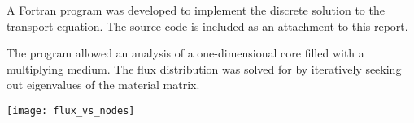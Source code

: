 \documentclass[../main.tex]{subfiles}
\begin{document}
A Fortran program was developed to implement the discrete solution to the transport equation. The source code is included as an attachment to this report. 

The program allowed an analysis of a one-dimensional core filled with a multiplying medium. The flux distribution was solved for by iteratively seeking out eigenvalues of the material matrix. 

\texttt{[image: flux\_vs\_nodes]}
\end{document}
